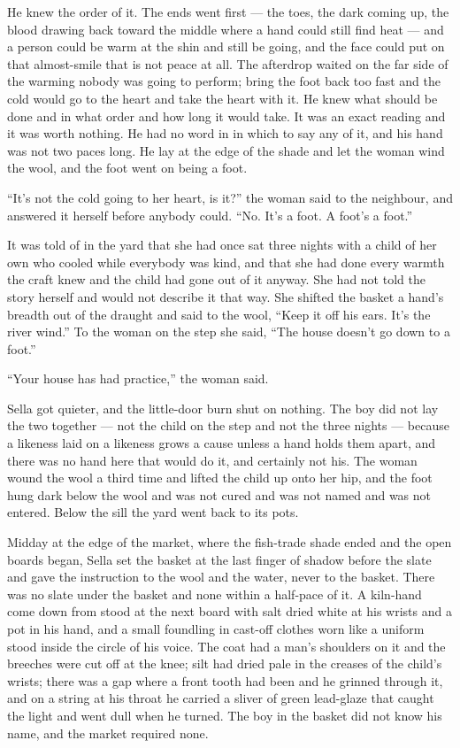 He knew the order of it. The ends went first --- the toes, the dark coming up, the blood drawing back toward the middle where a hand could still find heat --- and a person could be warm at the shin and still be going, and the face could put on that almost-smile that is not peace at all. The afterdrop waited on the far side of the warming nobody was going to perform; bring the foot back too fast and the cold would go to the heart and take the heart with it. He knew what should be done and in what order and how long it would take. It was an exact reading and it was worth nothing. He had no word in  in which to say any of it, and his hand was not two paces long. He lay at the edge of the shade and let the woman wind the wool, and the foot went on being a foot.

“It's not the cold going to her heart, is it?” the woman said to the neighbour, and answered it herself before anybody could. “No. It's a foot. A foot's a foot.”

It was told of  in the yard that she had once sat three nights with a child of her own who cooled while everybody was kind, and that she had done every warmth the craft knew and the child had gone out of it anyway. She had not told the story herself and would not describe it that way. She shifted the basket a hand's breadth out of the draught and said to the wool, “Keep it off his ears. It's the river wind.” To the woman on the step she said, “The house doesn't go down to a foot.”

“Your house has had practice,” the woman said.

Sella got quieter, and the little-door burn shut on nothing. The boy did not lay the two together --- not the child on the step and not the three nights --- because a likeness laid on a likeness grows a cause unless a hand holds them apart, and there was no hand here that would do it, and certainly not his. The woman wound the wool a third time and lifted the child up onto her hip, and the foot hung dark below the wool and was not cured and was not named and was not entered. Below the sill the yard went back to its pots.

\scenebreak

Midday at the edge of the  market, where the fish-trade shade ended and the open boards began, Sella set the basket at the last finger of shadow before the slate and gave the instruction to the wool and the water, never to the basket. There was no slate under the basket and none within a half-pace of it. A kiln-hand come down from  stood at the next board with salt dried white at his wrists and a pot in his hand, and a small foundling in cast-off clothes worn like a uniform stood inside the circle of his voice. The coat had a man's shoulders on it and the breeches were cut off at the knee; silt had dried pale in the creases of the child's wrists; there was a gap where a front tooth had been and he grinned through it, and on a string at his throat he carried a sliver of green lead-glaze that caught the light and went dull when he turned. The boy in the basket did not know his name, and the market required none.


